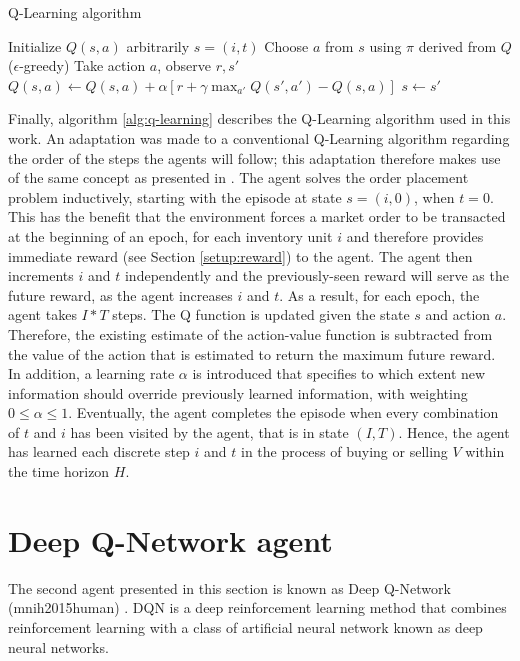 \begin{algorithm}
\caption{Q-Learning algorithm}\label{alg:q-learning}
\begin{algorithmic}[1]
\State Initialize $Q(s,a)$ arbitrarily
\State $s=(i, t)$
\State Choose $a$ from $s$ using $\pi$ derived from $Q$ ($\epsilon$-greedy)
\State Take action $a$, observe $r, s'$
\State $Q(s,a) \gets Q(s,a)+ \alpha[r+ \gamma \max_{a'}Q(s',a')-Q(s,a)]$
\State $s \gets s'$
\EndFor
\EndFor
\EndFor
\end{algorithmic}
\end{algorithm}
Finally, algorithm \ref{alg:q-learning} describes the Q-Learning algorithm used in this work.
An adaptation was made to a conventional Q-Learning algorithm\cite{sutton1998reinforcement} regarding the order of the steps the agents will follow; this adaptation therefore makes use of the same concept as presented in \cite{nevmyvaka2006reinforcement}.
The agent solves the order placement problem inductively, starting with the episode at state $s=(i,0)$, when $t=0$.
This has the benefit that the environment forces a market order to be transacted at the beginning of an epoch, for each inventory unit $i$ and therefore provides immediate reward (see Section \ref{setup:reward}) to the agent.
The agent then increments $i$ and $t$ independently and the previously-seen reward will serve as the future reward, as the agent increases $i$ and $t$.
As a result, for each epoch, the agent takes $I*T$ steps.
The Q function is updated given the state $s$ and action $a$.
Therefore, the existing estimate of the action-value function is subtracted from the value of the action that is estimated to return the maximum future reward.
In addition, a learning rate $\alpha$ is introduced that specifies to which extent new information should override previously learned information, with weighting $0 \le \alpha \le 1$.
Eventually, the agent completes the episode when every combination of $t$ and $i$ has been visited by the agent, that is in state $(I, T)$.
Hence, the agent has learned each discrete step $i$ and $t$ in the process of buying or selling $V$ within the time horizon $H$.

\section{Deep Q-Network agent}
\label{setup:dqn}
The second agent presented in this section is known as Deep Q-Network (mnih2015human) \cite{mnih2015human}.
DQN is a deep reinforcement learning method that combines reinforcement learning with a class
of artificial neural network known as deep neural networks.

